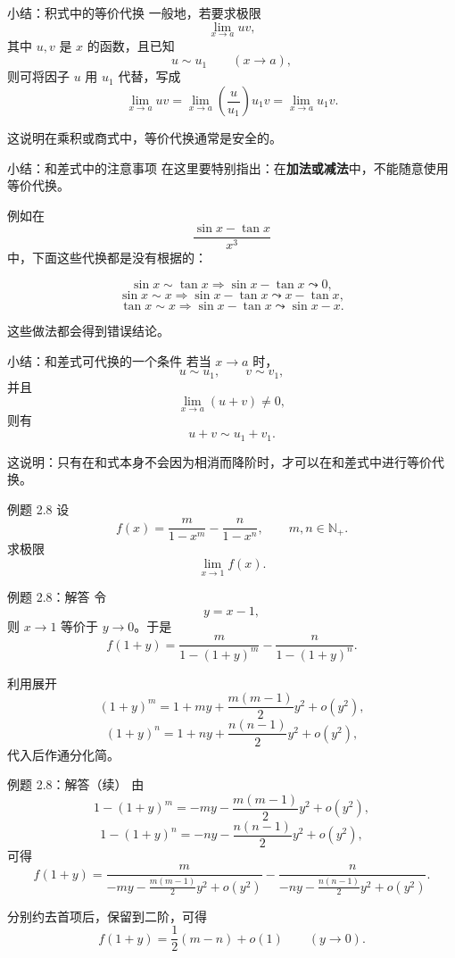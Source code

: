 ﻿\documentclass[aspectratio=169,11pt]{ctexbeamer}
\begin{document}
\begin{frame}{小结：积式中的等价代换}
一般地，若要求极限
\[
  \lim_{x\to a}uv,
\]
其中 $u,v$ 是 $x$ 的函数，且已知
\[
  u\sim u_1\qquad (x\to a),
\]
则可将因子 $u$ 用 $u_1$ 代替，写成
\[
  \lim_{x\to a}uv
  =
  \lim_{x\to a}\left(\frac{u}{u_1}\right)u_1v
  =
  \lim_{x\to a}u_1v.
\]

这说明在乘积或商式中，等价代换通常是安全的。
\end{frame}

\begin{frame}{小结：和差式中的注意事项}
在这里要特别指出：在\textbf{加法或减法}中，不能随意使用等价代换。

\vspace{0.6em}
例如在
\[
  \frac{\sin x-\tan x}{x^3}
\]
中，下面这些代换都是没有根据的：

\[
  \sin x\sim \tan x \Rightarrow \sin x-\tan x \leadsto 0,
\]
\[
  \sin x\sim x \Rightarrow \sin x-\tan x \leadsto x-\tan x,
\]
\[
  \tan x\sim x \Rightarrow \sin x-\tan x \leadsto \sin x-x.
\]

这些做法都会得到错误结论。
\end{frame}

\begin{frame}{小结：和差式可代换的一个条件}
若当 $x\to a$ 时，
\[
  u\sim u_1,\qquad v\sim v_1,
\]
并且
\[
  \lim_{x\to a}(u+v)\ne 0,
\]
则有
\[
  u+v\sim u_1+v_1.
\]

\vspace{0.6em}
这说明：只有在和式本身不会因为相消而降阶时，才可以在和差式中进行等价代换。
\end{frame}

\begin{frame}{例题 2.8}
设
\[
  f(x)=\frac{m}{1-x^m}-\frac{n}{1-x^n},\qquad m,n\in\mathbb{N}_+.
\]
求极限
\[
  \lim_{x\to 1}f(x).
\]
\end{frame}

\begin{frame}{例题 2.8：解答}
令
\[
  y=x-1,
\]
则 $x\to 1$ 等价于 $y\to 0$。于是
\[
  f(1+y)=\frac{m}{1-(1+y)^m}-\frac{n}{1-(1+y)^n}.
\]

利用展开
\[
  (1+y)^m=1+my+\frac{m(m-1)}{2}y^2+o(y^2),
\]
\[
  (1+y)^n=1+ny+\frac{n(n-1)}{2}y^2+o(y^2),
\]
代入后作通分化简。
\end{frame}

\begin{frame}{例题 2.8：解答（续）}
由
\[
  1-(1+y)^m=-my-\frac{m(m-1)}{2}y^2+o(y^2),
\]
\[
  1-(1+y)^n=-ny-\frac{n(n-1)}{2}y^2+o(y^2),
\]
可得
\[
  f(1+y)
  =
  \frac{m}{-my-\frac{m(m-1)}{2}y^2+o(y^2)}
  -
  \frac{n}{-ny-\frac{n(n-1)}{2}y^2+o(y^2)}.
\]

分别约去首项后，保留到二阶，可得
\[
  f(1+y)=\frac12(m-n)+o(1)\qquad (y\to 0).
\]
\end{frame}
\end{document}
